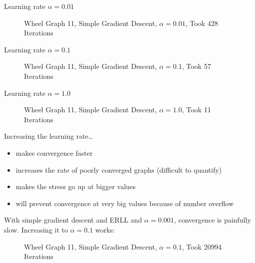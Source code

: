 \documentclass{beamer}
\begin{document}
\begin{frame}{Learning rate $\alpha=0.01$}
\begin{figure}[H]
\centering 

\caption{\label{wheel-graph-alpha-0.01} Wheel Graph 11, Simple Gradient Descent, $\alpha=0.01$, Took 428 Iterations}
\end{figure}
\end{frame}

\begin{frame}{Learning rate $\alpha=0.1$}
\begin{figure}[H]
\centering

\caption{\label{wheel-graph-alpha-0.1} Wheel Graph 11, Simple Gradient Descent, $\alpha=0.1$, Took 57 Iterations}
\end{figure}
\end{frame}

\begin{frame}{Learning rate $\alpha=1.0$}
\begin{figure}[H]
\centering

\caption{\label{wheel-graph-alpha-1.0} Wheel Graph 11, Simple Gradient Descent, $\alpha=1.0$, Took 11 Iterations}
\end{figure}
\end{frame}

\begin{frame}
Increasing the learning rate\dots
\begin{itemize}
    \item makes convergence faster
    \item increases the rate of poorly converged graphs (difficult to quantify)
    \item makes the stress go up at bigger values
    \item will prevent convergence at very big values because of number overflow
\end{itemize}
\end{frame}


\begin{frame}
    With simple gradient descent and ERLL and $\alpha=0.001$, convergence is painfully slow. Increasing it to $\alpha=0.1$ works:
    
    \begin{figure}[H]
    \centering
    
    \caption{\label{wheel-graph-erll} Wheel Graph 11, Simple Gradient Descent, $\alpha=0.1$, Took 20994 Iterations}
    \end{figure}
\end{frame}
\end{document}

